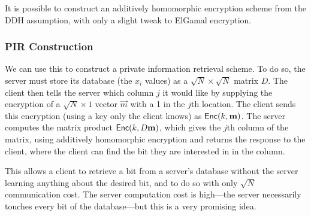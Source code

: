 It is possible to construct an additively homomorphic encryption scheme from the DDH assumption, with only a slight tweak to ElGamal encryption.

\subsubsection{PIR Construction}
We can use this to construct a private information retrieval scheme. To do so, the server must store its database (the $x_i$ values) as a $\sqrt{N} \times \sqrt{N}$ matrix $D$. The client then tells the server which column $j$ it would like by supplying the encryption of a $\sqrt{N} \times 1$ vector $\vec{m}$ with a 1 in the $j$th location. The client sends this encryption (using a key only the client knows) as $\mathsf{Enc}(k, \mathbf{m})$. The server computes the matrix product $\mathsf{Enc}(k, D\mathbf{m})$, which gives the $j$th column of the matrix, using additively homomorphic encryption and returns the response to the client, where the client can find the bit they are interested in in the column. 

This allows a client to retrieve a bit from a server's database without the server learning anything about the desired bit, and to do so with only $\sqrt{N}$ communication cost. The server computation cost is high---the server necessarily touches every bit of the database---but this is a very promising idea.
